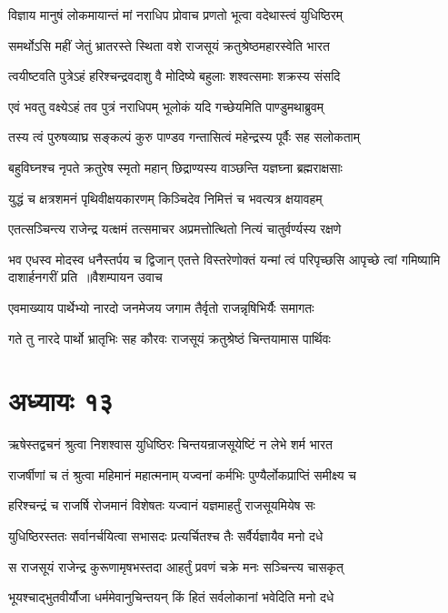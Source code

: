 \twolineshloka
{विज्ञाय मानुषं लोकमायान्तं मां नराधिप}
{प्रोवाच प्रणतो भूत्वा वदेथास्त्वं युधिष्ठिरम्}


\twolineshloka
{समर्थोऽसि महीं जेतुं भ्रातरस्ते स्थिता वशे}
{राजसूयं क्रतुश्रेष्ठमहारस्वेति भारत}


\twolineshloka
{त्वयीष्टवति पुत्रेऽहं हरिश्चन्द्रवदाशु वै}
{मोदिष्ये बहुलाः शश्वत्समाः शक्रस्य संसदि}


\twolineshloka
{एवं भवतु वक्ष्येऽहं तव पुत्रं नराधिपम्}
{भूलोकं यदि गच्छेयमिति पाण्डुमथाब्रुवम्}


\twolineshloka
{तस्य त्वं पुरुषव्याघ्र सङ्कल्पं कुरु पाण्डव}
{गन्तासित्वं महेन्द्रस्य पूर्वैः सह सलोकताम्}


\twolineshloka
{बहुविघ्नश्च नृपते क्रतुरेष स्मृतो महान्}
{छिद्राण्यस्य वाञ्छन्ति यज्ञघ्ना ब्रह्मराक्षसाः}


\twolineshloka
{युद्धं च क्षत्रशमनं पृथिवीक्षयकारणम्}
{किञ्चिदेव निमित्तं च भवत्यत्र क्षयावहम्}


\twolineshloka
{एतत्सञ्चिन्त्य राजेन्द्र यत्क्षमं तत्समाचर}
{अप्रमत्तोत्थितो नित्यं चातुर्वर्ण्यस्य रक्षणे}


\fourlineindentedshloka
{भव एधस्व मोदस्व धनैस्तर्पय च द्विजान्}
{एतत्ते विस्तरेणोक्तं यन्मां त्वं परिपृच्छसि}
{आपृच्छे त्वां गमिष्यामि दाशार्हनगरीं प्रति ॥वैशम्पायन उवाच}
{}


\twolineshloka
{एवमाख्याय पार्थेभ्यो नारदो जनमेजय}
{जगाम तैर्वृतो राजन्नृषिभिर्यैः समागतः}


\twolineshloka
{गते तु नारदे पार्थो भ्रातृभिः सह कौरवः}
{राजसूयं क्रतुश्रेष्ठं चिन्तयामास पार्थिवः}


\chapter{अध्यायः १३}
\twolineshloka
{ऋषेस्तद्वचनं श्रुत्वा निशश्वास युधिष्ठिरः}
{चिन्तयन्राजसूयेष्टिं न लेभे शर्म भारत}


\twolineshloka
{राजर्षीणां च तं श्रुत्वा महिमानं महात्मनाम्}
{यज्वनां कर्मभिः पुण्यैर्लोकप्राप्तिं समीक्ष्य च}


\twolineshloka
{हरिश्चन्द्रं च राजर्षि रोजमानं विशेषतः}
{यज्वानं यज्ञमाहर्तुं राजसूयमियेष सः}


\twolineshloka
{युधिष्ठिरस्ततः सर्वानर्चयित्वा सभासदः}
{प्रत्यर्चितश्च तैः सर्वैर्यज्ञायैव मनो दधे}


\twolineshloka
{स राजसूयं राजेन्द्र कुरूणामृषभस्तदा}
{आहर्तुं प्रवणं चक्रे मनः सञ्चिन्त्य चासकृत्}


\twolineshloka
{भूयश्चाद्भुतवीर्यौजा धर्ममेवानुचिन्तयन्}
{किं हितं सर्वलोकानां भवेदिति मनो दधे}


